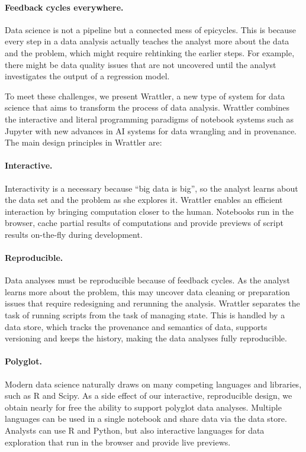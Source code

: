 \documentclass[sigplan,preprint,10pt]{acmart}\settopmatter{printfolios=true,printccs=false,printacmref=false}
\theoremstyle{plain}
\theoremstyle{definition}
\begin{document}
\paragraph{Feedback cycles everywhere.} Data science is 
not a pipeline but a connected mess of epicycles. This is because every step 
in a data analysis actually teaches 
the analyst more about the data and the problem, which might require rehtinking the earlier steps. 
For example, there might be data quality issues that 
are not uncovered until the analyst
investigates the output of a regression model. 

\vspace{1em}
To meet these challenges, we present Wrattler,
a new type of system for data science
that aims to transform the process
of data analysis.
Wrattler combines the interactive and literal programming paradigms
of notebook systems such as Jupyter
with new advances in AI systems for data wrangling and in provenance.
The main design principles in Wrattler are:

\paragraph{Interactive.} Interactivity
is a necessary because ``big data is big'', so the analyst learns about 
the data set and the problem as she explores it.
Wrattler enables an efficient interaction by bringing computation closer to the human.
Notebooks run in the browser, cache partial results of computations and provide previews
of script results on-the-fly during development.

\paragraph{Reproducible.} 
Data analyses must be reproducible
because of feedback cycles. As the
analyst learns more about the problem,
this may uncover data cleaning or preparation issues that require
redesigning and rerunning the analysis.
Wrattler separates the task of running scripts from the task of managing state. 
This is handled by a data store, which tracks the provenance and semantics of data, supports 
versioning and keeps the history, making the data analyses fully reproducible.

\paragraph{Polyglot.}
Modern data science naturally draws
on many competing languages and libraries, such as R and Scipy. As a side effect
of our interactive, reproducible design,
we obtain nearly for free the ability
to support polyglot data analyses.
Multiple languages can be used in a single notebook and share data via the data store.
Analysts can use R and Python, but also interactive languages for data exploration
that run in the browser and provide live previews.
\end{document}
